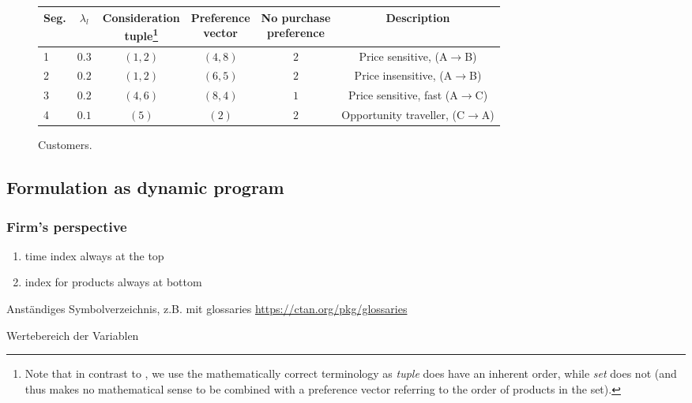 \begin{figure}
	\begin{subtable}{\linewidth}
		\caption{Customers.\label{tb:AirDesc:Cust}}
		\small
		\centering
		\begin{tabular}{lccccc}
			\toprule
			Seg. & $\lambda_l$ & \specialcell[b]{Consideration\\tuple\footnote{Note that in contrast to \cite{Bront.2009}, we use the mathematically correct terminology as \emph{tuple} does have an inherent order, while \emph{set} does not (and thus makes no mathematical sense to be combined with a preference vector referring to the order of products in the set).}} & \specialcell[b]{Preference \\vector} & \specialcell[b]{No purchase \\preference} & Description\\
			\midrule
			1 & $0.3$ & $(1, 2)$ & $(4, 8)$ & $2$ & Price sensitive, (A$\rightarrow$B)\\
			2 & $0.2$ & $(1, 2)$ & $(6, 5)$ & $2$ & Price insensitive, (A$\rightarrow$B)\\
			3 & $0.2$ & $(4, 6)$ & $(8, 4)$ & $1$ & Price sensitive, fast (A$\rightarrow$C)\\
			4 & $0.1$ & $(5)$ & $(2)$ & $2$ & Opportunity traveller, (C$\rightarrow$A)\\
			\bottomrule
		\end{tabular}
	\end{subtable}
\end{figure}


\subsection{Formulation as dynamic program}\label{ss:Prob:FormDynProg}

\subsubsection{Firm's perspective}

\begin{boxStefan}
	\begin{enumerate}
		\item time index always at the top
		\item index for products always at bottom
	\end{enumerate}

	Anständiges Symbolverzeichnis, z.B. mit glossaries \url{https://ctan.org/pkg/glossaries}
	
	Wertebereich der Variablen
\end{boxStefan}

